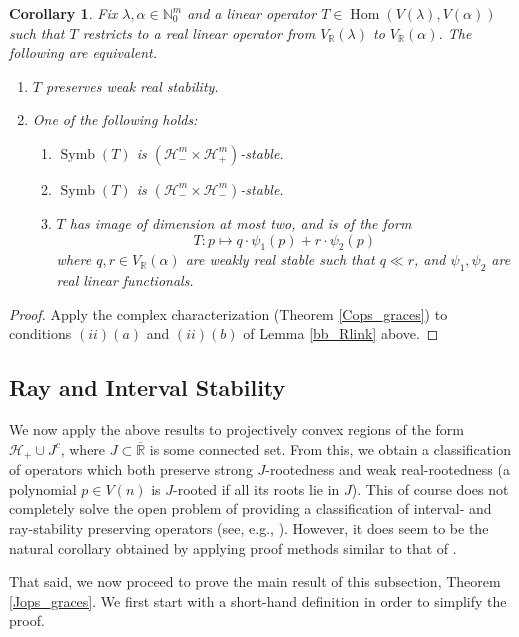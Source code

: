 \documentclass{article}
\newtheorem{corollary}[theorem]{Corollary}
\theoremstyle{definition}
\theoremstyle{plain}
\newcommand{\R}{\mathbb{R}}
\newcommand{\N}{\mathbb{N}}
\newcommand{\UHP}{\mathcal{H}_+}
\newcommand{\LHP}{\mathcal{H}_-}
\DeclareMathOperator{\Symb}{Symb}
\DeclareMathOperator{\Hom}{Hom}
\begin{document}
\begin{corollary}\label{bb_Rops}
    Fix $\lambda,\alpha \in \N_0^m$ and a linear operator $T \in \Hom(V(\lambda),V(\alpha))$ such that $T$ restricts to a real linear operator from $V_\R(\lambda)$ to $V_\R(\alpha)$. The following are equivalent.
    \begin{enumerate}[label=(\roman*)]
        \item $T$ preserves weak real stability.
        \item One of the following holds:
            \begin{enumerate}[label=(\alph*)]
                \item $\Symb(T)$ is $(\LHP^m \times \UHP^m)$-stable.
                \item $\Symb(T)$ is $(\LHP^m \times \LHP^m)$-stable.
                \item $T$ has image of dimension at most two, and is of the form
                \[
                    T: p \mapsto q \cdot \psi_1(p) + r \cdot \psi_2(p)
                \]
                where $q,r \in V_\R(\alpha)$ are weakly real stable such that $q \ll r$, and $\psi_1,\psi_2$ are real linear functionals.
            \end{enumerate}
    \end{enumerate}
\end{corollary}
\begin{proof}
    Apply the complex characterization (Theorem \ref{Cops_graces}) to conditions $(ii)(a)$ and $(ii)(b)$ of Lemma \ref{bb_Rlink} above.
\end{proof}

\subsection{Ray and Interval Stability}\label{Jops_subsect}

We now apply the above results to projectively convex regions of the form $\UHP \cup J^c$, where $J \subset \overline{\R}$ is some connected set. From this, we obtain a classification of operators which both preserve strong $J$-rootedness and weak real-rootedness (a polynomial $p \in V(n)$ is $J$-rooted if all its roots lie in $J$). This of course does not completely solve the open problem of providing a classification of interval- and ray-stability preserving operators (see, e.g., \cite{bba}). However, it does seem to be the natural corollary obtained by applying proof methods similar to that of \cite{bb1}.

That said, we now proceed to prove the main result of this subsection, Theorem \ref{Jops_graces}. We first start with a short-hand definition in order to simplify the proof.
\end{document}
